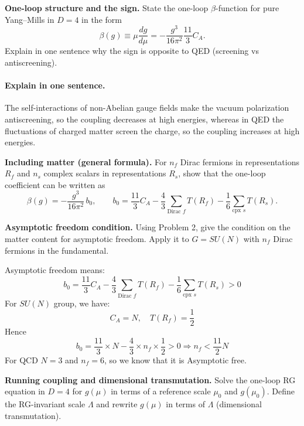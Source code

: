 \begin{problem}
    \textbf{One-loop structure and the sign.} State the one-loop \(\beta\)-function for pure Yang–Mills in \(D=4\) in the form
    \[
        \beta(g)\equiv \mu\frac{dg}{d\mu}=-\frac{g^3}{16\pi^2}\frac{11}{3}C_A.
    \]
    Explain in one sentence why the sign is opposite to QED (screening vs antiscreening).
\end{problem}
\begin{solution}[31.1]
	\paragraph{Explain in one sentence.} The self-interactions of non-Abelian gauge fields make the vacuum polarization antiscreening, so the coupling decreases at high energies, whereas in QED the fluctuations of charged matter screen the charge, so the coupling increases at high energies.
\end{solution}
\begin{problem}
    \textbf{Including matter (general formula).} For \(n_f\) Dirac fermions in representations \(R_f\) and \(n_s\) complex scalars in representations \(R_s\), show that the one-loop coefficient can be written as
    \[
        \beta(g)=-\frac{g^3}{16\pi^2}\,b_0,\qquad
        b_0=\frac{11}{3}C_A-\frac{4}{3}\sum_{\text{Dirac }f}T(R_f)-\frac{1}{6}\sum_{\text{cpx }s}T(R_s).
    \]
\end{problem}
\begin{problem}
    \textbf{Asymptotic freedom condition.} Using Problem 2, give the condition on the matter content for asymptotic freedom. Apply it to \(G=SU(N)\) with \(n_f\) Dirac fermions in the fundamental.
\end{problem}
\begin{solution}[31.3]
		Asymptotic freedom means:
	\[
	\boxed{
		b_0=\frac{11}{3}C_A-\frac{4}{3}\sum_{\text{Dirac }f}T(R_f)-\frac{1}{6}\sum_{\text{cpx }s}T(R_s)> 0
	}
	\]
	For $SU(N)$ group, we have:
	\[
	C_A=N,\quad T(R_f)=\frac12
	\]
	Hence
	\[
	b_0=\frac{11}{3}\times N-\frac43 \times n_f\times\frac12>0\Rightarrow \boxed{n_f<\frac{11}{2}N}
	\]
	For QCD $N=3$ and $n_f=6$, so we know that it is Asymptotic free.
\end{solution}
\begin{problem}
    \textbf{Running coupling and dimensional transmutation.} Solve the one-loop RG equation in \(D=4\) for \(g(\mu)\) in terms of a reference scale \(\mu_0\) and \(g(\mu_0)\). Define the RG-invariant scale \(\Lambda\) and rewrite \(g(\mu)\) in terms of \(\Lambda\) (dimensional transmutation).
\end{problem}
